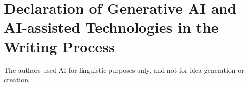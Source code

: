 \documentclass[final]{cas-dc}
\begin{document}
\maketitle














\section*{Declaration of Generative AI and AI-assisted Technologies in the Writing Process}
The authors used AI for linguistic purposes only, and not for idea generation or creation.




\FloatBarrier
\end{document}
